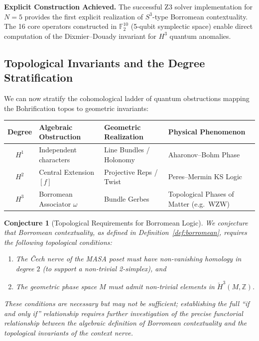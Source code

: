 \documentclass[11pt]{article}
\newtheorem{conjecture}[theorem]{Conjecture}
\begin{document}
\textbf{Explicit Construction Achieved.} The successful Z3 solver implementation for $N=5$ provides the first explicit realization of $S^3$-type Borromean contextuality. The 16 core operators constructed in $\mathbb{F}_2^{10}$ (5-qubit symplectic space) enable direct computation of the Dixmier--Douady invariant for $H^3$ quantum anomalies.

\subsection{Topological Invariants and the Degree Stratification}
\label{subsec:degree-strat}

We can now stratify the cohomological ladder of quantum obstructions mapping the Bohrification topos to geometric invariants:

\begin{center}
\renewcommand{\arraystretch}{1.4}
\begin{tabular}{cp{4cm}p{4.5cm}p{4.5cm}}
\toprule
\textbf{Degree} & \textbf{Algebraic Obstruction} & \textbf{Geometric Realization} & \textbf{Physical Phenomenon} \\
\midrule
$H^1$ & Independent characters & Line Bundles / Holonomy & Aharonov--Bohm Phase \\
$H^2$ & Central Extension $[f]$~\cite{PaperIII} & Projective Reps / Twist & Peres--Mermin KS Logic~\cite{Peres90,Mermin90} \\
$H^3$ & Borromean Associator $\omega$ & Bundle Gerbes & Topological Phases of Matter (e.g.~WZW) \\
\bottomrule
\end{tabular}
\end{center}

\begin{conjecture}[Topological Requirements for Borromean Logic]
\label{conj:borromean-top}
We conjecture that Borromean contextuality, as defined in Definition~\ref{def:borromean}, requires the following topological conditions:
\begin{enumerate}
    \item The \v{C}ech nerve of the MASA poset must have non-vanishing homology in degree $2$ (to support a non-trivial 2-simplex), and
    \item The geometric phase space $M$ must admit non-trivial elements in $\check{H}^3(M, \mathbb{Z})$.
\end{enumerate}
These conditions are necessary but may not be sufficient; establishing the full ``if and only if'' relationship requires further investigation of the precise functorial relationship between the algebraic definition of Borromean contextuality and the topological invariants of the context nerve.
\end{conjecture}
\end{document}
